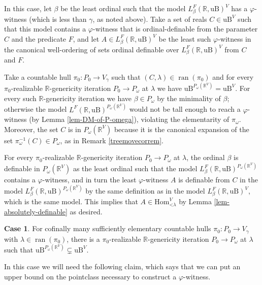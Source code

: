 \documentclass[fleqn, 11pt]{amsart}
\theoremstyle{plain}
\theoremstyle{definition}
\newtheorem{case}{Case}
\theoremstyle{remark}
\newcommand{\Hom}{\mathrm{Hom}}
\newcommand{\uB}{\mathrm{uB}}
\DeclareMathOperator{\ran}{ran}
\begin{document}
In this case, let $\beta$ be the least ordinal such that the model $L_\beta^F(\mathbb{R}, \uB)^V$ has a $\varphi$-witness (which is less than $\gamma$, as noted above). Take a set of reals $C \in \uB^V$ such that this model 
contains a $\varphi$-witness that is ordinal-definable from the parameter $C$ and the predicate $F$, and let $A \in L_\beta^F(\mathbb{R}, \uB)^V$ be the least such $\varphi$-witness in the canonical well-ordering of sets ordinal definable over $L^{F}_{\beta}(\mathbb{R}, \uB)^{V}$ from $C$ and $F$.

Take a countable hull $\pi_0 \colon P_0 \to V_{\gamma}$ such that $(C, \lambda) \in \ran(\pi_0)$ and for every $\pi_0$-realizable $\mathbb{R}$-genericity iteration $P_0\to P_\omega$ at $\lambda$ we have $\uB^{P_\omega(\mathbb{R}^V)} = \uB^V$. For every such $\mathbb{R}$-genericity iteration we have $\beta \in P_\omega$ by the minimality of $\beta$; otherwise the model $L^F(\mathbb{R}, \uB)^{P_\omega(\mathbb{R}^V)}$ would not be tall enough to reach a $\varphi$-witness (by Lemma \ref{lem-DM-of-P-omega}), violating the elementarity of $\pi_\omega$. Moreover, the set $C$ is in $P_\omega(\mathbb{R}^V)$ because it is the canonical expansion of the set $\pi_\omega^{-1}(C) \in P_\omega$, as in Remark \ref{treemovecorrem}. 

For every $\pi_0$-realizable $\mathbb{R}$-genericity iteration $P_0\to P_\omega$ at $\lambda$, the ordinal $\beta$ is definable in $P_\omega(\mathbb{R}^V)$ as the least ordinal such that the model $L_\beta^F(\mathbb{R}, \uB)^{P_\omega(\mathbb{R}^V)}$ contains a $\varphi$-witness, and in turn the least $\varphi$-witness $A$ is definable from $C$ in the model $L_\beta^F(\mathbb{R}, \uB)^{P_\omega(\mathbb{R}^V)}$ by the same definition as in the model $L_\beta^F(\mathbb{R}, \uB)^V$, which is the same model. This implies that $A \in \Hom_{\mathord{<}\lambda}^V$ by Lemma \ref{lem-absolutely-definable} as desired.

\begin{case}\label{case-part-of-uB}
 For cofinally many sufficiently elementary countable hulls $\pi_0 \colon P_0 \to V_{\gamma}$ with $\lambda \in \ran(\pi_0)$, there is a $\pi_0$-realizable $\mathbb{R}$-genericity iteration $P_0\to P_\omega$ at $\lambda$ such that $\uB^{P_\omega(\mathbb{R}^V)} \subsetneq \uB^V$.
\end{case}

In this case we will need the following claim, which says that we can put an upper bound on the pointclass necessary to construct a $\varphi$-witness.
\end{document}
